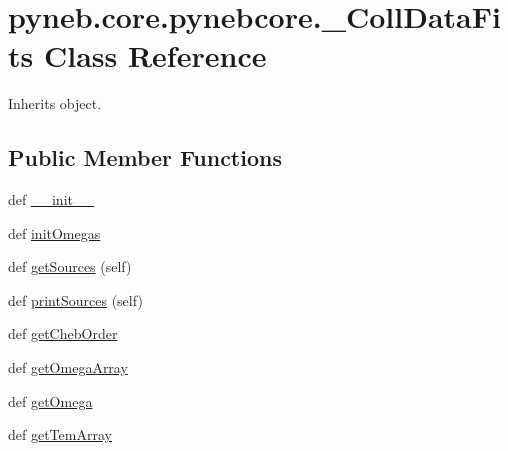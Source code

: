 \hypertarget{classpyneb_1_1core_1_1pynebcore_1_1___coll_data_fits}{}\section{pyneb.\+core.\+pynebcore.\+\_\+\+Coll\+Data\+Fits Class Reference}
\label{classpyneb_1_1core_1_1pynebcore_1_1___coll_data_fits}


Inherits object.

\subsection*{Public Member Functions}
\begin{DoxyCompactItemize}
\item 
def \hyperlink{classpyneb_1_1core_1_1pynebcore_1_1___coll_data_fits_a34dd1c347e0328a9f282d418e14cf653}{\+\_\+\+\_\+init\+\_\+\+\_\+}
\item 
def \hyperlink{classpyneb_1_1core_1_1pynebcore_1_1___coll_data_fits_ab8bb7b193ca2b9ccf6adf11453347226}{init\+Omegas}
\item 
def \hyperlink{classpyneb_1_1core_1_1pynebcore_1_1___coll_data_fits_a13ff2c1aef93336f152a248e534bd104}{get\+Sources} (self)
\item 
def \hyperlink{classpyneb_1_1core_1_1pynebcore_1_1___coll_data_fits_a4894e804fd2ea5cf1947de2535d2243f}{print\+Sources} (self)
\item 
def \hyperlink{classpyneb_1_1core_1_1pynebcore_1_1___coll_data_fits_ac2e555f92570ed4df42926d0c415ac4c}{get\+Cheb\+Order}
\item 
def \hyperlink{classpyneb_1_1core_1_1pynebcore_1_1___coll_data_fits_acca4425c4b7d2e08d0b1b9fe6e1846a7}{get\+Omega\+Array}
\item 
def \hyperlink{classpyneb_1_1core_1_1pynebcore_1_1___coll_data_fits_a07beca7cf9ee37f231754f0458fb8c2f}{get\+Omega}
\item 
def \hyperlink{classpyneb_1_1core_1_1pynebcore_1_1___coll_data_fits_a6b53fa73abb34d16f1066dc52604f25c}{get\+Tem\+Array}
\end{DoxyCompactItemize}
